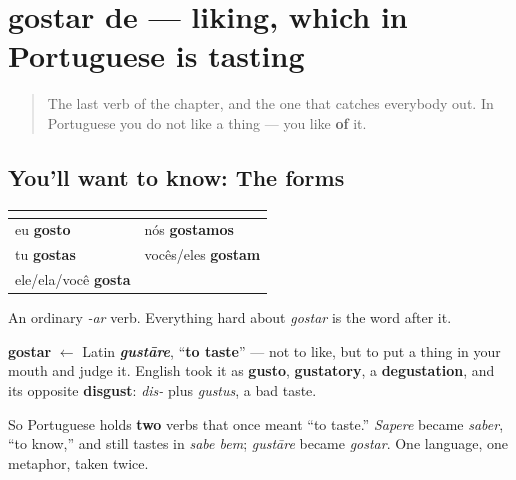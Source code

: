 \section[gostar de]{gostar de — liking, which in Portuguese is tasting}

\label{lesson:PT-C19-gostar}



\begin{quote}
The last verb of the chapter, and the one that catches everybody out. In Portuguese you do not like a thing — you like \textbf{of} it.
\end{quote}

\subsection*{You'll want to know: The forms}
\noindent
\begin{tabularx}{\linewidth}{@{}>{\raggedright\arraybackslash}X>{\raggedright\arraybackslash}X@{}}
\toprule
\textbf{} & \textbf{} \\
\midrule
eu \textbf{gosto} & nós \textbf{gostamos} \\
tu \textbf{gostas} & vocês/eles \textbf{gostam} \\
ele/ela/você \textbf{gosta} &  \\
\bottomrule
\end{tabularx}

An ordinary \emph{-ar} verb. Everything hard about \emph{gostar} is the word after it.

\begin{cousinweb}
\textbf{gostar} $\leftarrow$ Latin \emph{\textbf{gustāre}}, \textquotedblleft{}\textbf{to taste}\textquotedblright{} — not to like, but to put a thing in your mouth and judge it. English took it as \textbf{gusto}, \textbf{gustatory}, a \textbf{degustation}, and its opposite \textbf{disgust}: \emph{dis-} plus \emph{gustus}, a bad taste.

So Portuguese holds \textbf{two} verbs that once meant \textquotedblleft{}to taste.\textquotedblright{} \emph{Sapere} became \emph{saber}, \textquotedblleft{}to know,\textquotedblright{} and still tastes in \emph{sabe bem}; \emph{gustāre} became \emph{gostar}. One language, one metaphor, taken twice.
\end{cousinweb}

